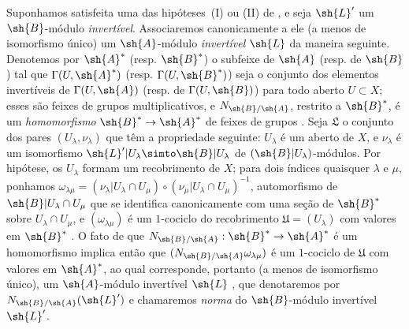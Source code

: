 \documentclass[oneside,10pt]{amsart}
\makeatletter
\newcommand{\ega@arrow}[2]{\mathchoice{#1}{#2}{#2}{#2}}
\renewcommand{\to}{\ega@arrow{\longrightarrow}{\rightarrow}}
\newcommand{\oldpage}[2][]{\marginnote{\normalfont\footnotesize\textbf{#1}~|~#2}\ignorespaces}
\let\EGAOriginalLabel\label
\renewcommand{\label}[1]{\phantomsection\EGAOriginalLabel{#1}}
\makeatother
\begin{document}
\begin{env}[6.5.2]
\label{II.6.5.2}
Suponhamos satisfeita uma das hipóteses~(I) ou (II) de , e seja $\sh{L}'$ um $\sh{B}$-módulo \emph{invertível}.
Associaremos canonicamente a ele (a menos de isomorfismo único) um $\sh{A}$-módulo \emph{invertível} $\sh{L}$ da maneira seguinte.
Denotemos por $\sh{A}^*$ (resp. $\sh{B}^*$) o subfeixe de $\sh{A}$ (resp. de $\sh{B}$) tal que $\Gamma(U,\sh{A}^*)$ (resp. $\Gamma(U,\sh{B}^*)$) seja o conjunto dos
\oldpage[II]{127}
elementos invertíveis de $\Gamma(U,\sh{A})$ (resp. de $\Gamma(U,\sh{B})$) para todo aberto $U\subset X$;
esses são feixes de grupos multiplicativos, e $N_{\sh{B}/\sh{A}}$, restrito a $\sh{B}^*$, é um \emph{homomorfismo} $\sh{B}^*\to\sh{A}^*$ de feixes de grupos .
Seja $\mathfrak{L}$ o conjunto dos pares $(U_\lambda,\nu_\lambda)$ que têm a propriedade seguinte: $U_\lambda$ é um aberto de $X$, e $\nu_\lambda$ é um isomorfismo $\sh{L}'|U_\lambda\simto\sh{B}|U_\lambda$ de $(\sh{B}|U_\lambda)$-módulos.
Por hipótese, os $U_\lambda$ formam um recobrimento de $X$;
para dois índices quaisquer $\lambda$ e $\mu$, ponhamos $\omega_{\lambda\mu}=(\nu_\lambda|U_\lambda\cap U_\mu)\circ(\nu_\mu|U_\lambda\cap U_\mu)^{-1}$, automorfismo de $\sh{B}|U_\lambda\cap U_\mu$ que se identifica canonicamente com uma seção de $\sh{B}^*$ sobre $U_\lambda\cap U_\mu$, e $(\omega_{\lambda\mu})$ é um $1$-cociclo do recobrimento $\mathfrak{U}=(U_\lambda)$ com valores em $\sh{B}^*$ .
O fato de que $N_{\sh{B}/\sh{A}}:\sh{B}^*\to\sh{A}^*$ é um homomorfismo implica então que $(N_{\sh{B}/\sh{A}}\omega_{\lambda\mu})$ é um $1$-cociclo de $\mathfrak{U}$ com valores em $\sh{A}^*$, ao qual corresponde, portanto (a menos de isomorfismo único), um $\sh{A}$-módulo invertível $\sh{L}$ , que denotaremos por $N_{\sh{B}/\sh{A}}(\sh{L}')$ e chamaremos \emph{norma} do $\sh{B}$-módulo invertível $\sh{L}'$.


\end{env}
\end{document}
